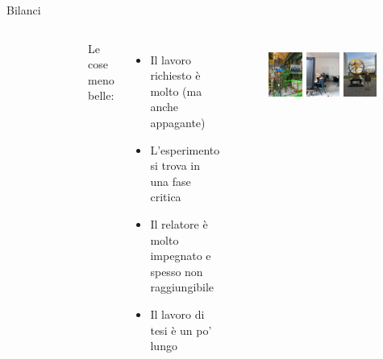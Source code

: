 \documentclass[
10pt,
aspectratio=169,
]{beamer}
\begin{document}
\begin{frame}{Bilanci}
\begin{columns}
\begin{figure}
    \end{figure}
    Le cose meno belle:
    \begin{itemize}
    \item Il lavoro richiesto è molto (ma anche appagante)
    \item L'esperimento si trova in una fase critica 
    \item Il relatore è molto impegnato e spesso non raggiungibile
    \item Il lavoro di tesi è un po' lungo
\end{itemize}
\begin{figure}
        \centering
        \includegraphics[width=0.3\textwidth]{caverna.jpeg}
                \includegraphics[width=0.3\textwidth]{ufficio.jpeg}
        \includegraphics[width=0.3\textwidth]{shiva.jpeg}

    \end{figure}
\end{columns}
\end{frame}
\end{document}
